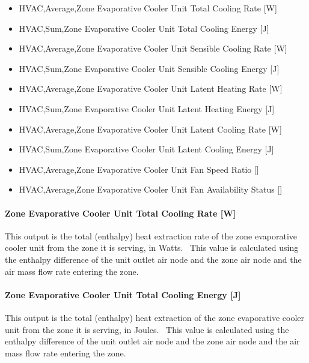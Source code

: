 \begin{itemize}
\item
  HVAC,Average,Zone Evaporative Cooler Unit Total Cooling Rate {[}W{]}
\item
  HVAC,Sum,Zone Evaporative Cooler Unit Total Cooling Energy {[}J{]}
\item
  HVAC,Average,Zone Evaporative Cooler Unit Sensible Cooling Rate {[}W{]}
\item
  HVAC,Sum,Zone Evaporative Cooler Unit Sensible Cooling Energy {[}J{]}
\item
  HVAC,Average,Zone Evaporative Cooler Unit Latent Heating Rate {[}W{]}
\item
  HVAC,Sum,Zone Evaporative Cooler Unit Latent Heating Energy {[}J{]}
\item
  HVAC,Average,Zone Evaporative Cooler Unit Latent Cooling Rate {[}W{]}
\item
  HVAC,Sum,Zone Evaporative Cooler Unit Latent Cooling Energy {[}J{]}
\item
  HVAC,Average,Zone Evaporative Cooler Unit Fan Speed Ratio {[]}
\item
  HVAC,Average,Zone Evaporative Cooler Unit Fan Availability Status {[]}
\end{itemize}

\paragraph{Zone Evaporative Cooler Unit Total Cooling Rate {[}W{]}}\label{zone-evaporative-cooler-unit-total-cooling-rate-w}

This output is the total (enthalpy) heat extraction rate of the zone evaporative cooler unit from the zone it is serving, in Watts.~ This value is calculated using the enthalpy difference of the unit outlet air node and the zone air node and the air mass flow rate entering the zone.

\paragraph{Zone Evaporative Cooler Unit Total Cooling Energy {[}J{]}}\label{zone-evaporative-cooler-unit-total-cooling-energy-j}

This output is the total (enthalpy) heat extraction of the zone evaporative cooler unit from the zone it is serving, in Joules.~ This value is calculated using the enthalpy difference of the unit outlet air node and the zone air node and the air mass flow rate entering the zone.

